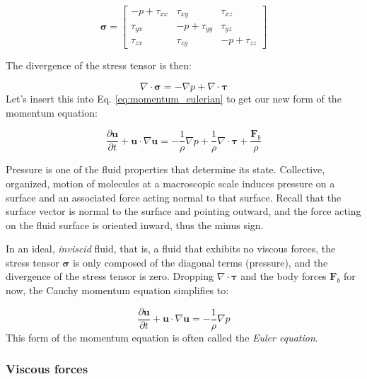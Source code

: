\documentclass[12pt]{article}
\numberwithin{equation}{section}
\numberwithin{figure}{section}
\numberwithin{table}{section}
\begin{document}
\begin{equation}
  \boldsymbol{\sigma} = \begin{bmatrix}
    -p + \tau_{xx} & \tau_{xy} & \tau_{xz} \\
    \tau_{yx} & -p + \tau_{yy} & \tau_{yz} \\
    \tau_{zx} & \tau_{zy} & -p + \tau_{zz}
  \end{bmatrix}
\end{equation}

The divergence of the stress tensor is then:

\begin{equation}
  \nabla \cdot \boldsymbol{\sigma} = - \nabla p + \nabla \cdot \boldsymbol{\tau}
\end{equation}
Let's insert this into Eq. \ref{eq:momentum_eulerian} to get our new form of
the momentum equation:

\begin{equation}
  \frac{\partial \mathbf{u}}{\partial t} + \mathbf{u} \cdot \nabla \mathbf{u} =
  - \frac{1}{\rho} \nabla p + \frac{1}{\rho} \nabla \cdot \boldsymbol{\tau} + \frac{\mathbf{F}_b}{\rho}
  \label{eq:momentum_cauchy_with_shear}
\end{equation}

Pressure is one of the fluid properties that determine its state.
Collective, organized, motion of molecules at a macroscopic scale induces
pressure on a surface and an associated force acting normal to that surface.
Recall that the surface vector is normal to the surface and pointing outward,
and the force acting on the fluid surface is oriented inward, thus the minus sign.

In an ideal, \textit{inviscid} fluid, that is, a fluid that exhibits no viscous
forces, the stress tensor $\boldsymbol{\sigma}$ is only composed of the diagonal
terms (pressure), and the divergence of the stress tensor is zero.
Dropping $\nabla \cdot \boldsymbol{\tau}$ and the body forces $\mathbf{F}_b$ for
now, the Cauchy momentum equation simplifies to:

\begin{equation}
  \frac{\partial \mathbf{u}}{\partial t} + \mathbf{u} \cdot \nabla \mathbf{u} =
  - \frac{1}{\rho} \nabla p
  \label{eq:momentum_euler}
\end{equation}
This form of the momentum equation is often called the \textit{Euler equation}.

\subsubsection{Viscous forces}
\label{sec:viscous_forces}
\end{document}
